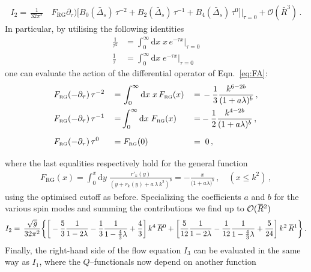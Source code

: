 \documentclass[11pt]{book}
\newcommand{\overbar}[1]{\mkern 1.5mu\overline{\mkern-1.5mu#1\mkern-1.5mu}\mkern 1.5mu}
\newcommand{\bR}{\overbar R}
\newcommand\FRG{ F_{\scriptscriptstyle{\mathrm{RG}}} }
\numberwithin{equation}{chapter}
\begin{document}
\begin{appendices}
\begin{align}
  I_2 = \, \frac{1}{32\pi^2} \, &\FRG \partial_\tau)
  \Big[
    B_0(\bar\Delta_s) \, \tau^{-2} +
    B_2(\bar\Delta_s) \, \tau^{-1}
    + B_4(\bar\Delta_s) \, \tau^{0}
  \Big] \bigg|_{\tau=0}
    + \mathcal O(\bar R^3)
    \,.
    \label{eq:I2-in-heatkernel}
\end{align}
In particular, by utilising the following identities
\begin{align}
  \frac 1{\tau^2} &= \int_0^\infty \mathrm dx \; x \, e^{-\tau x} \bigg|_{\tau=0} \\
  \frac 1\tau &= \int_0^\infty \mathrm dx \; e^{-\tau x} \bigg|_{\tau=0}
\end{align}
one can evaluate the action of the differential operator of Eqn.~\eqref{eq:FA}:
\begin{alignat}{4}
  \FRG (-\partial_\tau) \,
  &\tau^{-2}
  \, &=& \,
  \int_0^\infty \mathrm dx \; x \, \FRG (x)
  \, &=& \,
  - \frac 13 \frac{k^{6-2b}}{(1+a\lambda)^b} \,,
  \label{eq:threshold-I2-const} \\
  \FRG (-\partial_\tau) \,
  &\tau^{-1}
  &=& \int_0^\infty \mathrm dx \; \FRG (x)
  &=& - \frac 12 \frac{k^{4-2b}}{(1+a\lambda)^b} \,,
  \label{eq:threshold-I2-lin} \\
  \vphantom{\int_0^\infty}
  \FRG (-\partial_\tau) \,
  &\tau^0
  &=& \; \FRG (0)
  &=& \;\; 0 \label{eq:threshold-I2-quad} \,,
\end{alignat}
where the last equalities respectively hold for the general function
\begin{align}
  \FRG (x)
  = \int^{x}_0 \mathrm dy \; \frac{r'_k(y)}{(y+r_k(y)+a \, \lambda \, k^2)^b}
  =  -\frac{x}{ \big( 1 + a \lambda \big)^b } \,, \quad (x \leq k^2) \,,
\end{align}
using the optimised cutoff as before.
Specializing the coefficients $a$ and $b$ for the various spin modes
and summing the contributions we find up to $\mathcal O(\bR^2)$
\begin{align}
  I_2 = \, \frac{ \sqrt {\bar g} }{ 32 \pi^2 }
  \bigg\lbrace
  \bigg[
    - \frac 53 \frac {1}{1 - 2 \lambda}
    - \frac 13 \frac {1}{1 - \frac 43 \lambda}
    + \frac 43
  \bigg] \, k^4 \, \bR^0
  + \bigg[
    \frac {5}{12} \frac{1}{1 - 2 \lambda}
    - \frac {1}{12} \frac{1}{1 - \frac 43 \lambda}
    + \frac {5}{24}
  \bigg] \, k^2 \, \bR^1
  \bigg\rbrace
  \,.
\end{align}
Finally, the right-hand side of the flow equation $I_3$ can be evaluated
in the same way as $I_1$, where the $Q$--functionals now depend on another
function
\begin{align}

\end{align}
\end{appendices}
\end{document}
